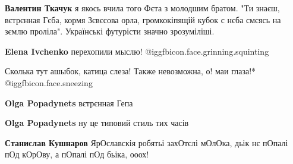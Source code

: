 \begin{itemize}
\begin{itemize}
\textbf{Валентин Ткачук} я якось вчила того Фєта з молодшим братом. "Ти знаєш, вєтрєнная Гєба, кормя Зєвєсова орла, громкокіпящій кубок с нєба смєясь на зємлю проліла". Українські футурісти значно зрозуміліші.

 
\textbf{Elena Ivchenko} перехопили мыслю! @igg{fbicon.face.grinning.squinting} 

 
Сколька тут ашыбок, катица слеза!
Также невозможна,
о! маи глаза!* @igg{fbicon.face.sneezing} 

 
\textbf{Olga Popadynets} вєтрєнная Гепа

 
\textbf{Olga Popadynets} ну це типовий стиль тих часів

 
\textbf{Станислав Кушнаров} ЯрОславскія робятьі захОтєлі мОлОка, дьік нє пОпалі пОд кОрОву, а пОпалі пОд бьіка, ооох!

 

\end{itemize}
\end{itemize}

